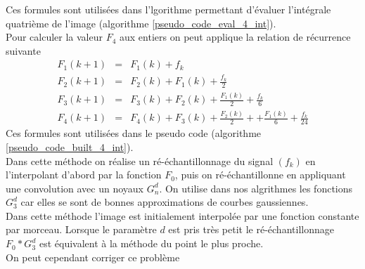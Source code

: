 Ces formules sont utilisées dans l'lgorithme permettant d'évaluer l'intégrale quatrième de l'image (algorithme \ref{pseudo_code_eval_4_int}).\\
Pour calculer la valeur $F_4$ aux entiers on peut applique la relation de récurrence suivante
\begin{eqnarray*}
F_{1}(k+1)&=&  F_{1}(k)+f_{k}  \\
F_{2}(k+1)&=&  F_{2}(k)+F_{1}(k)+\frac{f_{k}}{2}   \\
F_{3}(k+1)&=&  F_{3}(k)+F_{2}(k)+\frac{F_{1}(k)}{2}+\frac{f_{k}}{6}   \\
F_{4}(k+1)&=&  F_{4}(k)+F_{3}(k)+\frac{F_{2}(k)}{2}++\frac{F_{1}(k)}{6}+\frac{f_{k}}{24}  
\end{eqnarray*}
Ces formules sont utilisées dans le pseudo code (algorithme \ref{pseudo_code_built_4_int}).\\
Dans cette méthode on réalise un ré-échantillonnage du signal $(f_k)$ en l'interpolant d'abord par la fonction $F_{0}$, puis on ré-échantillonne en appliquant une convolution avec un noyaux $G_n^d$. On utilise dans nos algrithmes les fonctions $G_3^d$ car elles se sont de bonnes approximations de courbes gaussiennes.\\ %
Dans cette méthode l'image est initialement interpolée par une fonction constante par morceau. Lorsque le paramètre $d$ est pris très petit le ré-échantillonnage $F_{0}*G_3^d$ est équivalent à la méthode du point le plus proche.\\
On peut cependant corriger ce problème

